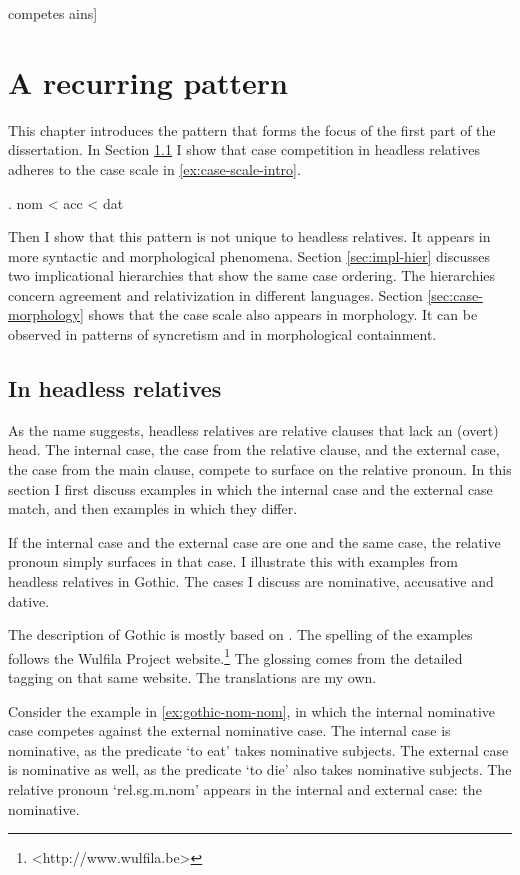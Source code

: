 competes ains]%

\chapter{A recurring pattern}\label{ch:recurring}

This chapter introduces the pattern that forms the focus of the first part of the dissertation. In Section \ref{sec:pattern-rels} I show that case competition in headless relatives adheres to the case scale in \ref{ex:case-scale-intro}.

\ex. \ac{nom} < \ac{acc} < \ac{dat}\label{ex:case-scale-intro}

Then I show that this pattern is not unique to headless relatives. It appears in more syntactic and morphological phenomena. Section \ref{sec:impl-hier} discusses two implicational hierarchies that show the same case ordering. The hierarchies concern agreement and relativization in different languages. Section \ref{sec:case-morphology} shows that the case scale also appears in morphology. It can be observed in patterns of syncretism and in morphological containment.


\section{In headless relatives}\label{sec:pattern-rels}

As the name suggests, headless relatives are relative clauses that lack an (overt) head. The internal case, the case from the relative clause, and the external case, the case from the main clause, compete to surface on the relative pronoun. In this section I first discuss examples in which the internal case and the external case match, and then examples in which they differ.

If the internal case and the external case are one and the same case, the relative pronoun simply surfaces in that case. I illustrate this with examples from headless relatives in Gothic. The cases I discuss are nominative, accusative and dative.

The description of Gothic is mostly based on \citep{harbert1978}. The spelling of the examples follows the Wulfila Project website.\footnote{
<http://www.wulfila.be>
} The glossing comes from the detailed tagging on that same website. The translations are my own.

Consider the example in \ref{ex:gothic-nom-nom}, in which the internal nominative case competes against the external nominative case.
The internal case is nominative, as the predicate  `to eat' takes nominative subjects.
The external case is nominative as well, as the predicate  `to die' also takes nominative subjects.
The relative pronoun  `\ac{rel}.\ac{sg}.\ac{m}.\ac{nom}' appears in the internal and external case: the nominative.

